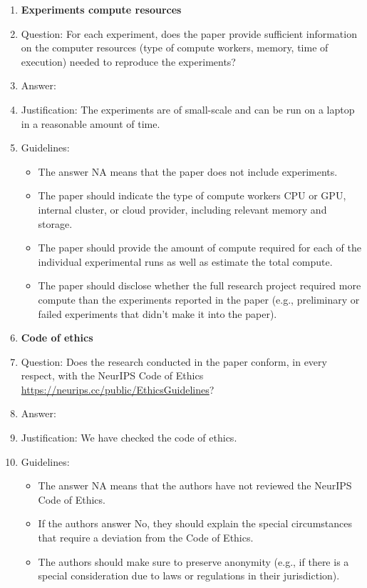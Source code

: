 \documentclass{article}
\begin{document}
{\begin{enumerate}
\item {\bf Experiments compute resources}
    \item[] Question: For each experiment, does the paper provide sufficient information on the computer resources (type of compute workers, memory, time of execution) needed to reproduce the experiments?
    \item[] Answer: \answerYes{} %
    \item[] Justification: The experiments are of small-scale and can be run on a laptop in a reasonable amount of time.
    \item[] Guidelines:
    \begin{itemize}
        \item The answer NA means that the paper does not include experiments.
        \item The paper should indicate the type of compute workers CPU or GPU, internal cluster, or cloud provider, including relevant memory and storage.
        \item The paper should provide the amount of compute required for each of the individual experimental runs as well as estimate the total compute. 
        \item The paper should disclose whether the full research project required more compute than the experiments reported in the paper (e.g., preliminary or failed experiments that didn't make it into the paper). 
    \end{itemize}
    
\item {\bf Code of ethics}
    \item[] Question: Does the research conducted in the paper conform, in every respect, with the NeurIPS Code of Ethics \url{https://neurips.cc/public/EthicsGuidelines}?
    \item[] Answer: \answerYes{} %
    \item[] Justification: We have checked the code of ethics.
    \item[] Guidelines:
    \begin{itemize}
        \item The answer NA means that the authors have not reviewed the NeurIPS Code of Ethics.
        \item If the authors answer No, they should explain the special circumstances that require a deviation from the Code of Ethics.
        \item The authors should make sure to preserve anonymity (e.g., if there is a special consideration due to laws or regulations in their jurisdiction).
    \end{itemize}



\end{enumerate}}
\end{document}
